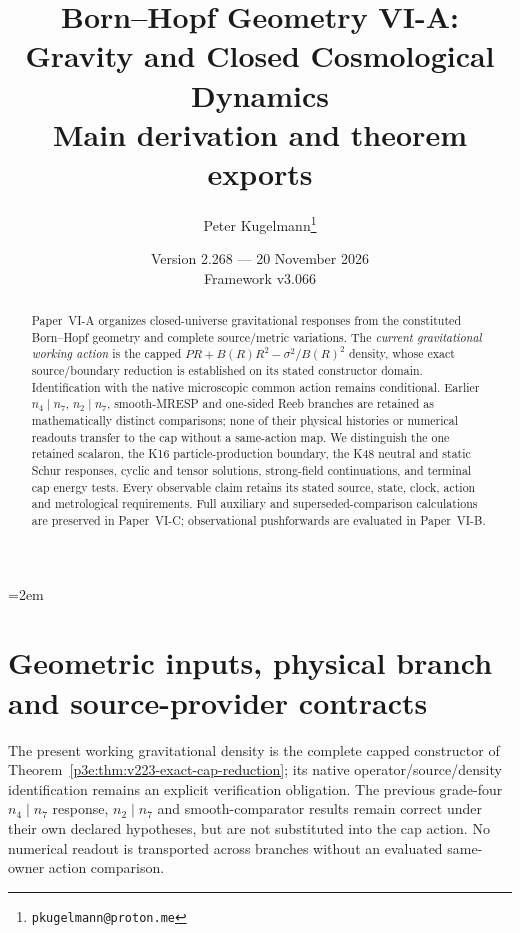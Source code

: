 \documentclass[12pt,a4paper]{article}
\title{\textbf{Born--Hopf Geometry VI-A: Gravity and Closed Cosmological Dynamics}\\[0.5em]\large Main derivation and theorem exports}
\author{Peter Kugelmann\thanks{\texttt{pkugelmann@proton.me}}}
\date{Version 2.268 --- 20 November 2026 \\ Framework v3.066}
\begin{document}
\emergencystretch=2em
\maketitle
\begin{abstract}
Paper~VI-A organizes closed-universe gravitational responses from the
constituted Born--Hopf geometry and complete source/metric variations.
The \emph{current gravitational working action} is the capped
$PR+B(R)R^2-\sigma^2/B(R)^2$ density, whose exact source/boundary
reduction is established on its stated constructor domain. Identification
with the native microscopic common action remains conditional.
Earlier $n_4\mid n_7$, $n_2\mid n_7$, smooth-MRESP and one-sided
Reeb branches are retained as mathematically distinct comparisons;
none of their physical histories or numerical readouts transfer to the cap
without a same-action map.
We distinguish the one retained scalaron, the K16 particle-production boundary,
the K48 neutral and static Schur responses, cyclic and tensor solutions, strong-field
continuations, and terminal cap energy tests. Every observable claim retains its
stated source, state, clock, action and metrological requirements. Full auxiliary
and superseded-comparison calculations are preserved in Paper~VI-C; observational
pushforwards are evaluated in Paper~VI-B.
\end{abstract}
\tableofcontents
\clearpage

\section{Geometric inputs, physical branch and source-provider contracts}
\label{p6a:sec:organized-a1}
The present working gravitational density is the complete capped
constructor of Theorem~\ref{p3e:thm:v223-exact-cap-reduction}; its
native operator/source/density identification remains an explicit
verification obligation. The previous grade-four $n_4\mid n_7$ response,
$n_2\mid n_7$ and smooth-comparator results remain correct under their
own declared hypotheses, but are not substituted into the cap action.
No numerical readout is transported across branches without an evaluated
same-owner action comparison.

\end{document}

